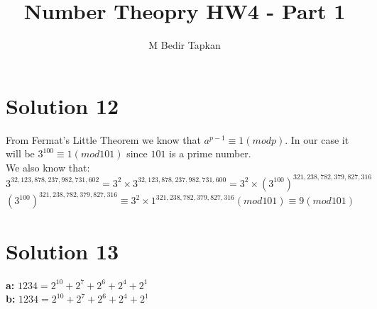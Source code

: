 \documentclass[12pt]{article}
\title{Number Theopry HW4 - Part 1}
\author{M Bedir Tapkan}
\begin{document}
	\maketitle\textsl{}

\section*{Solution 12}
From Fermat's Little Theorem we know that $a^{p-1} \equiv 1 (mod p)$. In our case it will be $3^{100} \equiv 1 (mod 101)$ since $101$ is a prime number.\\
We also know that:\\
$3^{32,123,878,237,982,731,602}  = 3^2 \times 3^{32,123,878,237,982,731,600} = 3^2 \times (3^{100})^{321,238,782,379,827,316}$\\
$(3^{100})^{321,238,782,379,827,316} \equiv 3^2 \times 1^{321,238,782,379,827,316} (mod 101) \equiv 9 (mod 101)$

\section*{Solution 13}
\textbf{a:} $1234 = 2^{10} + 2^7 + 2^6 + 2^4 + 2^1$\\
\textbf{b:} $1234 = 2^{10} + 2^7 + 2^6 + 2^4 + 2^1$\\
\end{document}

